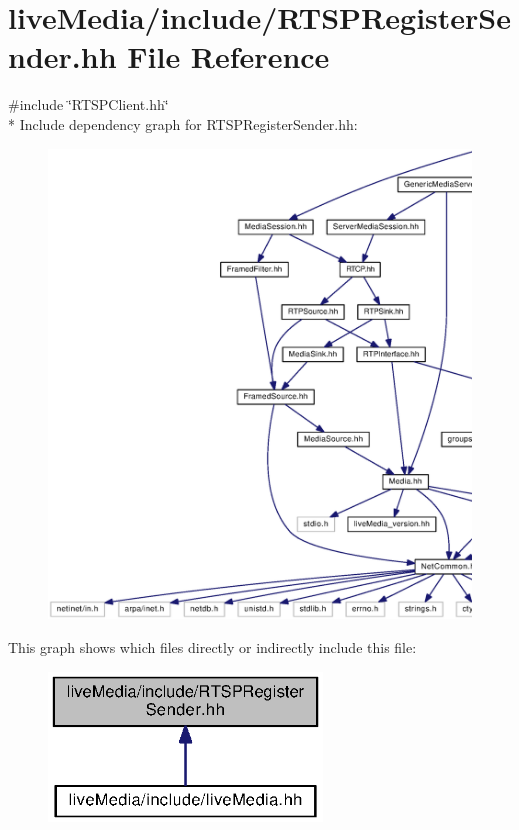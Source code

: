 \section{live\+Media/include/\+R\+T\+S\+P\+Register\+Sender.hh File Reference}
\label{RTSPRegisterSender_8hh}
{\ttfamily \#include \char`\"{}R\+T\+S\+P\+Client.\+hh\char`\"{}}\\*
Include dependency graph for R\+T\+S\+P\+Register\+Sender.\+hh\+:
\nopagebreak
\begin{figure}[H]
\begin{center}
\leavevmode
\includegraphics[width=350pt]{RTSPRegisterSender_8hh__incl}
\end{center}
\end{figure}
This graph shows which files directly or indirectly include this file\+:
\nopagebreak
\begin{figure}[H]
\begin{center}
\leavevmode
\includegraphics[width=206pt]{RTSPRegisterSender_8hh__dep__incl}
\end{center}
\end{figure}
